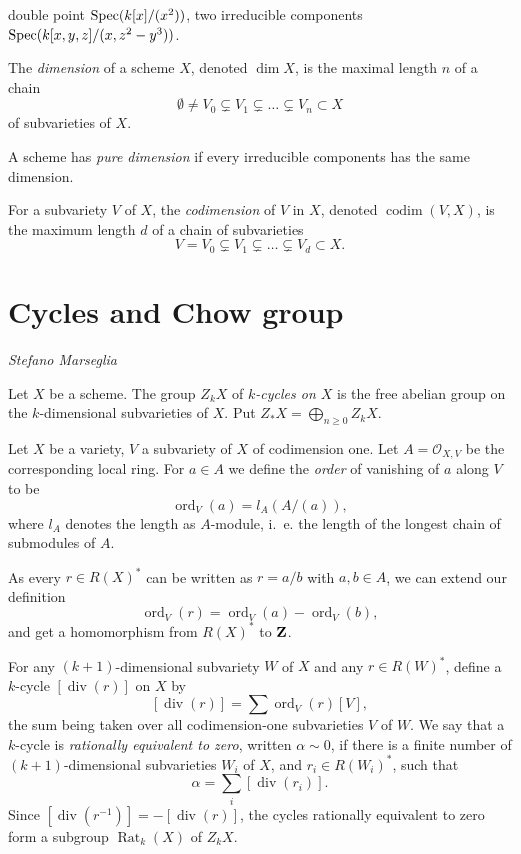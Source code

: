 \documentclass[a4paper,openany]{scrbook}
\DeclareMathOperator{\codim}{codim}
\DeclareMathOperator{\Rat}{Rat}
\DeclareMathOperator{\ord}{ord}
\DeclareMathOperator{\divisor}{div}
\newcommand{\chapterauthor}[1]{\hfill\emph{#1}\par\noindent}
\begin{document}
\begin{example} 
double point $\operatorname{Spec}(k[x]/(x^2))$, two irreducible components $\operatorname{Spec}(k[x,y,z]/(x,z^2-y^3))$.
\end{example}

\begin{defn}
The \emph{dimension} of a scheme $X$, denoted $\dim X$, is the maximal length $n$ of a chain
\[
\emptyset \neq V_0 \subsetneq V_1\subsetneq \ldots \subsetneq V_n\subset X
\]
of subvarieties of $X$.

A scheme has \emph{pure dimension} if every irreducible components has the same dimension.

For a subvariety $V$ of $X$, the \emph{codimension} of $V$ in $X$, denoted $\codim(V,X)$, is the maximum length $d$ of a chain of subvarieties
\[
V=V_0\subsetneq V_1\subsetneq \ldots \subsetneq V_d\subset X.
\]
\end{defn}

\section{Cycles and Chow group}
\chapterauthor{Stefano Marseglia}

Let $X$ be a scheme. The group $Z_kX$ of \emph{$k$-cycles on $X$} is the free abelian group on the $k$-dimensional subvarieties of $X$. Put $Z_*X=\bigoplus_{n\geq 0} Z_kX$.

Let $X$ be a variety, $V$ a subvariety of $X$ of codimension one. Let $A=\mathcal O_{X,V}$ be the corresponding local ring. For $a\in A$ we define the \emph{order} of vanishing of $a$ along $V$ to be
\[
\ord_V(a)=l_A(A/(a)),
\]
where $l_A$ denotes the length as $A$-module, i.~e. the length of the longest chain of submodules of $A$.

As every $r\in R(X)^*$ can be written as $r=a/b$ with $a,b\in A$, we can extend our definition
\[\ord_V(r)=\ord_V(a)-\ord_V(b),\]
and get a homomorphism from $R(X)^*$ to $\mathbf Z$.

For any $(k+1)$-dimensional subvariety $W$ of $X$ and any $r\in R(W)^*$, define a $k$-cycle $[\divisor(r)]$ on $X$ by
\[
[\divisor(r)]=\sum \ord_V(r)[V],
\]
the sum being taken over all codimension-one subvarieties $V$ of $W$. We say that a $k$-cycle is \emph{rationally equivalent to zero}, written $\alpha \sim 0$, if there is a finite number of $(k+1)$-dimensional subvarieties $W_i$ of $X$, and $r_i\in R(W_i)^*$, such that
\[\alpha = \sum_i[\divisor(r_i)].\]
Since $[\divisor(r^{-1})]=-[\divisor(r)]$, the cycles rationally equivalent to zero form a subgroup $\Rat_k(X)$ of $Z_kX$.
\end{document}
